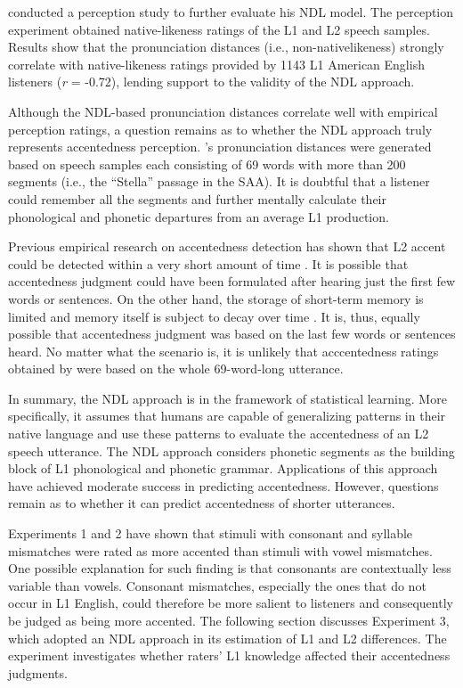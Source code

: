 \citet{Wieling_2014} conducted a perception study to further evaluate his NDL model. The perception experiment obtained native-likeness ratings of the L1 and L2 speech samples. Results show that the pronunciation distances (i.e., non-nativelikeness) strongly correlate with native-likeness ratings provided by 1143 L1 American English listeners (\textit{r} = -0.72), lending support to the validity of the NDL approach. 

Although the NDL-based pronunciation distances correlate well with empirical perception ratings, a question remains as to whether the NDL approach truly represents accentedness perception. \citet{Wieling_2014}’s pronunciation distances were generated based on speech samples each consisting of 69 words with more than 200 segments (i.e., the “Stella” passage in the SAA). It is doubtful that a listener could remember all the segments and further mentally calculate their phonological and phonetic departures from an average L1 production. 

Previous empirical research on accentedness detection has shown that L2 accent could be detected within a very short amount of time \citep{Flege_1984, Park_2013}. It is possible that accentedness judgment could have been formulated after hearing just the first few words or sentences. On the other hand, the storage of short-term memory is limited and memory itself is subject to decay over time \citep{Berman_2009, Miller_1956}. It is, thus, equally possible that accentedness judgment was based on the last few words or sentences heard. No matter what the scenario is, it is unlikely that acccentedness ratings obtained by \citet{Wieling_2014} were based on the whole 69-word-long utterance. 

In summary, the NDL approach is in the framework of statistical learning. More specifically, it assumes that humans are capable of generalizing patterns in their native language and use these patterns to evaluate the accentedness of an L2 speech utterance. The NDL approach considers phonetic segments as the building block of L1 phonological and phonetic grammar. Applications of this approach have achieved moderate success in predicting accentedness. However, questions remain as to whether it can predict accentedness of shorter utterances. 

Experiments 1 and 2 have shown that stimuli with consonant and syllable mismatches were rated as more accented than stimuli with vowel mismatches. One possible explanation for such finding is that consonants are contextually less variable than vowels. Consonant mismatches, especially the ones that do not occur in L1 English, could therefore be more salient to listeners and consequently be judged as being more accented. The following section discusses Experiment 3, which adopted an NDL approach in its estimation of L1 and L2 differences. The experiment investigates whether raters' L1 knowledge affected their accentedness judgments.

